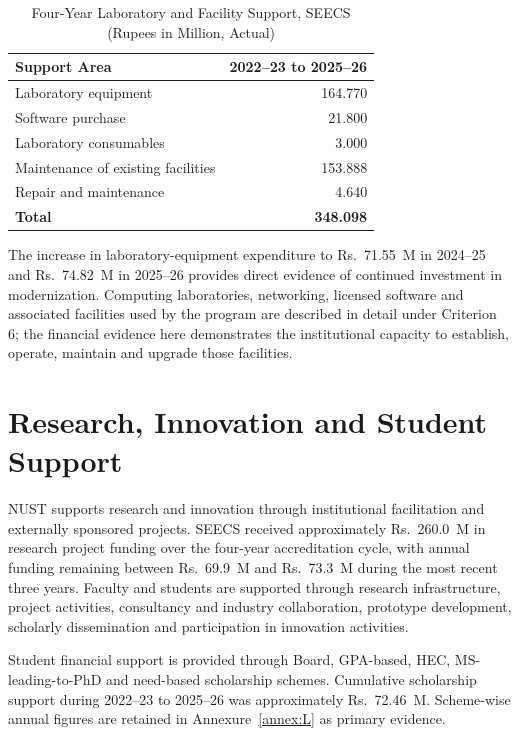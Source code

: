 \begin{table}[H]
\centering
\caption{Four-Year Laboratory and Facility Support, SEECS (Rupees in Million, Actual)}
\label{tab:c7_lab_support}
\begingroup\footnotesize
\setlength{\tabcolsep}{8pt}
\renewcommand{\arraystretch}{1.12}
\begin{tabular}{@{}lr@{}}
\toprule
\textbf{Support Area} & \textbf{2022--23 to 2025--26} \\
\midrule
Laboratory equipment & 164.770 \\
Software purchase & 21.800 \\
Laboratory consumables & 3.000 \\
Maintenance of existing facilities & 153.888 \\
Repair and maintenance & 4.640 \\
\midrule
\textbf{Total} & \textbf{348.098} \\
\bottomrule
\end{tabular}
\endgroup
\end{table}

The increase in laboratory-equipment expenditure to Rs.~71.55~M in 2024--25 and Rs.~74.82~M in 2025--26 provides direct evidence of continued investment in modernization. Computing laboratories, networking, licensed software and associated facilities used by the program are described in detail under Criterion 6; the financial evidence here demonstrates the institutional capacity to establish, operate, maintain and upgrade those facilities.

\hypertarget{research-innovation-student-support-c7}{%
\section{Research, Innovation and Student Support}\label{research-innovation-student-support-c7}}

NUST supports research and innovation through institutional facilitation and externally sponsored projects. SEECS received approximately Rs.~260.0~M in research project funding over the four-year accreditation cycle, with annual funding remaining between Rs.~69.9~M and Rs.~73.3~M during the most recent three years. Faculty and students are supported through research infrastructure, project activities, consultancy and industry collaboration, prototype development, scholarly dissemination and participation in innovation activities.

Student financial support is provided through Board, GPA-based, HEC, MS-leading-to-PhD and need-based scholarship schemes. Cumulative scholarship support during 2022--23 to 2025--26 was approximately Rs.~72.46~M. Scheme-wise annual figures are retained in Annexure~\ref{annex:L} as primary evidence.

